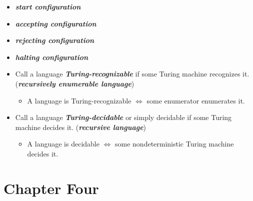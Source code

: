 \documentclass[12pt]{article}
\begin{document}
\label{orgf2f8120}
\begin{itemize}
\item \emph{\textbf{start configuration}}
\item \emph{\textbf{accepting configuration}}
\item \emph{\textbf{rejecting configuration}}
\item \emph{\textbf{halting configuration}}
\end{itemize}

\label{org6b51766}
\begin{itemize}
\item Call a language \emph{\textbf{Turing-recognizable}} if some Turing machine recognizes
it. (\emph{\textbf{recursively enumerable language}})
\begin{itemize}
\item A language is Turing-recognizable \(\iff\) some enumerator enumerates it.
\end{itemize}

\item Call a language \emph{\textbf{Turing-decidable}} or simply decidable if some Turing
machine decides it. (\emph{\textbf{recursive language}})
\begin{itemize}
\item A language is decidable \(\iff\) some nondeterministic Turing machine
decides it.
\end{itemize}
\end{itemize}

\section{Chapter Four}
\label{sec:orgf72244e}
\end{document}
